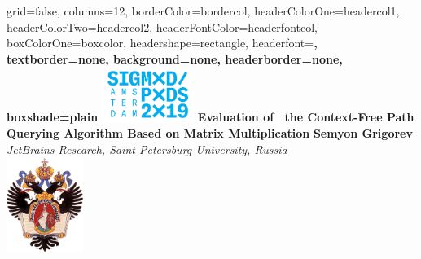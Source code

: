 \documentclass[a0paper,portrait]{baposter}
\begin{document}
\setlength{\fboxsep}{0pt}


\begin{poster}{
grid=false,
columns=12, %
borderColor=bordercol, %
headerColorOne=headercol1, %
headerColorTwo=headercol2, %
headerFontColor=headerfontcol, %
boxColorOne=boxcolor, %
headershape=rectangle, %
headerfont=\Large\sf\bf, %
textborder=none,
background=none,
headerborder=none, %
boxshade=plain
}
{\includegraphics[width=3cm]{sigm0d2.png}}
%
%
{\bf \huge{Evaluation of \ the Context-Free Path Querying Algorithm Based on Matrix Multiplication} }
{\vspace{0.6em} \smaller \textbf{Semyon Grigorev} \\  %
\smaller \it {JetBrains Research, Saint Petersburg University, Russia } \\ %
}
{\includegraphics[width=2.5cm]{SPbGU_Logo.png}} %



\end{poster}
\end{document}
